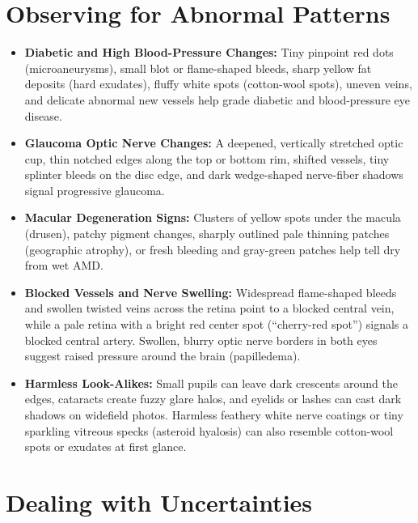 \section{Observing for Abnormal Patterns}

\begin{itemize}
    \item \textbf{Diabetic and High Blood-Pressure Changes:} Tiny pinpoint red dots (microaneurysms), small blot or flame-shaped bleeds, sharp yellow fat deposits (hard exudates), fluffy white spots (cotton-wool spots), uneven veins, and delicate abnormal new vessels help grade diabetic and blood-pressure eye disease.
    \item \textbf{Glaucoma Optic Nerve Changes:} A deepened, vertically stretched optic cup, thin notched edges along the top or bottom rim, shifted vessels, tiny splinter bleeds on the disc edge, and dark wedge-shaped nerve-fiber shadows signal progressive glaucoma.
    \item \textbf{Macular Degeneration Signs:} Clusters of yellow spots under the macula (drusen), patchy pigment changes, sharply outlined pale thinning patches (geographic atrophy), or fresh bleeding and gray-green patches help tell dry from wet AMD.
    \item \textbf{Blocked Vessels and Nerve Swelling:} Widespread flame-shaped bleeds and swollen twisted veins across the retina point to a blocked central vein, while a pale retina with a bright red center spot (``cherry-red spot'') signals a blocked central artery. Swollen, blurry optic nerve borders in both eyes suggest raised pressure around the brain (papilledema).
    \item \textbf{Harmless Look-Alikes:} Small pupils can leave dark crescents around the edges, cataracts create fuzzy glare halos, and eyelids or lashes can cast dark shadows on widefield photos. Harmless feathery white nerve coatings or tiny sparkling vitreous specks (asteroid hyalosis) can also resemble cotton-wool spots or exudates at first glance.
\end{itemize}

\section{Dealing with Uncertainties}

